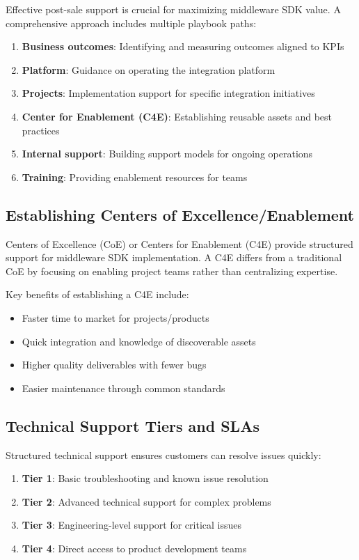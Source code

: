 \documentclass[11pt,a4paper]{article}
\begin{document}
Effective post-sale support is crucial for maximizing middleware SDK value. A comprehensive approach includes multiple playbook paths:

\begin{enumerate}
    \item \textbf{Business outcomes}: Identifying and measuring outcomes aligned to KPIs
    \item \textbf{Platform}: Guidance on operating the integration platform
    \item \textbf{Projects}: Implementation support for specific integration initiatives
    \item \textbf{Center for Enablement (C4E)}: Establishing reusable assets and best practices
    \item \textbf{Internal support}: Building support models for ongoing operations
    \item \textbf{Training}: Providing enablement resources for teams
\end{enumerate}

\subsection{Establishing Centers of Excellence/Enablement}

Centers of Excellence (CoE) or Centers for Enablement (C4E) provide structured support for middleware SDK implementation. A C4E differs from a traditional CoE by focusing on enabling project teams rather than centralizing expertise.

Key benefits of establishing a C4E include:
\begin{itemize}
    \item Faster time to market for projects/products
    \item Quick integration and knowledge of discoverable assets
    \item Higher quality deliverables with fewer bugs
    \item Easier maintenance through common standards
\end{itemize}

\subsection{Technical Support Tiers and SLAs}

Structured technical support ensures customers can resolve issues quickly:

\begin{enumerate}
    \item \textbf{Tier 1}: Basic troubleshooting and known issue resolution
    \item \textbf{Tier 2}: Advanced technical support for complex problems
    \item \textbf{Tier 3}: Engineering-level support for critical issues
    \item \textbf{Tier 4}: Direct access to product development teams
\end{enumerate}
\end{document}
